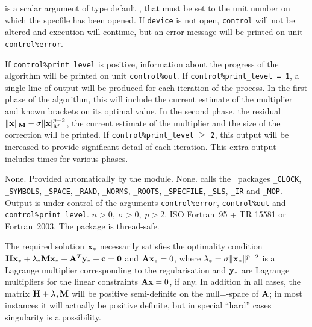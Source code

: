 \documentclass{galahad}
\newcommand{\packagename}{RQS}
\begin{document}
\begin{description}

 is a scalar \intentin argument of type default \integer,
that must be set to the unit number on which the specfile
has been opened. If {\tt device} is not open, {\tt control} will
not be altered and execution will continue, but an error message
will be printed on unit {\tt control\%error}.

\end{description}


\galinfo
If {\tt control\%print\_level} is positive, information about the progress
of the algorithm will be printed on unit {\tt control\-\%\-out}.
If {\tt control\%print\_level = 1}, a single line of output will be produced
for each iteration of the process. In the first phase of the algorithm,
this will include the current estimate of the multiplier and known
brackets on its optimal value. In the second phase, the residual
$\|{\mathbf{x}}\|_{{\mathbf{M}}} - \sigma \|{\mathbf{x}}|_M^{p-2}$,
the current estimate of the multiplier and
the size of the correction will be printed.
If {\tt control\%print\_level} $\geq$ {\tt 2}, this
output will be increased to provide significant detail of each iteration.
This extra output includes times for various phases.


\galgeneral

\galcommon None.
\galworkspace Provided automatically by the module.
\galroutines None.
\galmodules {\tt \packagename\_solve} calls the \galahad\ packages
{\tt \libraryname\_CLOCK},
{\tt \libraryname\_SY\-M\-BOLS},
{\tt \libraryname\_\-SPACE},
{\tt \libraryname\-\_\-RAND},
{\tt \libraryname\_\-NORMS},
{\tt \libraryname\_\-ROOTS},
{\tt \libraryname\_SPECFILE},
{\tt \libraryname\_SLS},
{\tt \libraryname\_IR}
and
{\tt \libraryname\_MOP}.
\galio Output is under control of the arguments
{\tt control\%error}, {\tt control\%out} and {\tt control\%print\_level}.
\galrestrictions $n  >  0, \;  \sigma  >  0, \; p > 2$.
\galportability ISO Fortran~95 + TR 15581 or Fortran~2003.
The package is thread-safe.


\galmethod
The required solution ${\mathbf{x}}_*$ necessarily satisfies the optimality condition
${\mathbf{H}} {\mathbf{x}}_* + \lambda_* {\mathbf{M}} {\mathbf{x}}_* + {\mathbf{A}}^T {\mathbf{y}}_* + {\mathbf{c}} = {\mathbf{0}}$ and
${\mathbf{A}} {\mathbf{x}}_* = 0$, where
$\lambda_* = \sigma \|{\mathbf{x}}_*\|^{p-2}$
is a Lagrange multiplier corresponding to the regularisation
and ${\mathbf{y}}_*$ are Lagrange multipliers for the linear constraints ${\mathbf{A}} {\mathbf{x}} = 0$,
if any.
In addition in all cases, the matrix ${\mathbf{H}} + \lambda_* {\mathbf{M}}$ will be positive
semi-definite on the null=-space of ${\mathbf{A}}$; in most instances it will actually
be positive definite, but in special ``hard'' cases singularity is a possibility.
\end{document}
